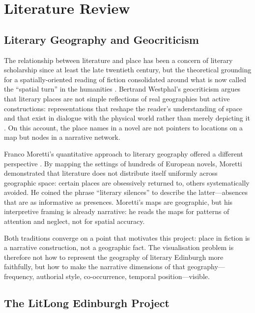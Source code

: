 \documentclass[logo,msc]{infthesis}
\begin{document}
 
\chapter{Literature Review}
\label{chap:lit}
 
\section{Literary Geography and Geocriticism}
 
The relationship between literature and place has been a concern of literary scholarship since at least the late twentieth century, but the theoretical grounding for a spatially-oriented reading of fiction consolidated around what is now called the ``spatial turn'' in the humanities \cite{tally2013}. Bertrand Westphal's geocriticism argues that literary places are not simple reflections of real geographies but active constructions: representations that reshape the reader's understanding of space and that exist in dialogue with the physical world rather than merely depicting it \cite{westphal2011}. On this account, the place names in a novel are not pointers to locations on a map but nodes in a narrative network.
 
Franco Moretti's quantitative approach to literary geography offered a different perspective \cite{moretti2005}. By mapping the settings of hundreds of European novels, Moretti demonstrated that literature does not distribute itself uniformly across geographic space: certain places are obsessively returned to, others systematically avoided. He coined the phrase ``literary silences'' to describe the latter---absences that are as informative as presences. Moretti's maps are geographic, but his interpretive framing is already narrative: he reads the maps for patterns of attention and neglect, not for spatial accuracy.
 
Both traditions converge on a point that motivates this project: place in fiction is a narrative construction, not a geographic fact. The visualisation problem is therefore not how to represent the geography of literary Edinburgh more faithfully, but how to make the narrative dimensions of that geography---frequency, authorial style, co-occurrence, temporal position---visible.
 
\section{The LitLong Edinburgh Project}
 
\end{document}
